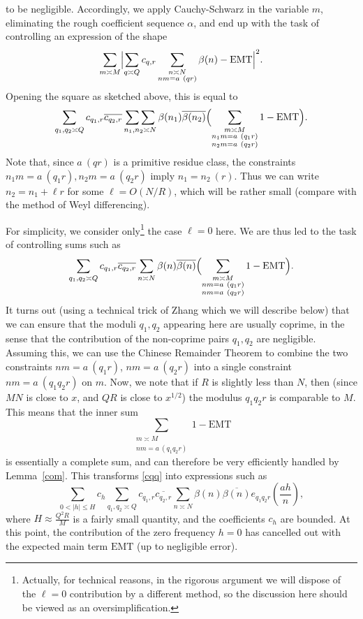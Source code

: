\documentclass[12pt,a4paper,reqno]{amsart}
\numberwithin{equation}{section}
\theoremstyle{plain}
\theoremstyle{definition}
\newcommand{\emt}{\mathrm{EMT}}
\newcommand\sumsum{\mathop{\sum\sum}\limits}
\renewcommand{\sim}{\asymp}
\begin{document}
to be negligible.  Accordingly, we apply Cauchy-Schwarz in the 
variable $m$, eliminating the rough coefficient sequence $\alpha$, and end
up with the task of controlling an expression of the shape
$$
\sum_{m \sim M} \Bigl|\sum_{q\sim Q} c_{q,r} \sum_{\substack{n \sim
    N\\ nm = a\ (qr)}} \beta(n)-\emt\Bigr|^2.
$$ 
Opening the square as sketched above, this is equal to
$$
\sum_{q_1,q_2 \sim Q} c_{q_1,r} \overline{c_{q_2,r}}
\sumsum_{n_1,n_2\sim N} \beta(n_1) \overline{\beta(n_2)} \Bigl(
\sum_{\substack{m \sim M\\ n_1m =a\ (q_1r)\\ n_2m= a\ (q_2 r)}}
1-\emt\Bigr).
$$ 
Note that, since $a\ (qr)$ is a primitive residue class, the
constraints $n_1 m = a\ (q_1r), n_2 m = a\ (q_2 r)$ imply $n_1 = n_2\
(r)$. Thus we can write $n_2 = n_1 + \ell r$ for some $\ell = O(N/R)$, which
will be rather small (compare with the method of Weyl differencing).
\par
For simplicity, we consider only\footnote{Actually, for technical reasons, in the rigorous argument we will dispose of the $\ell=0$ contribution by a different method, so the discussion here should be viewed as an oversimplification.} the case $\ell=0$ here.  We are thus led
to the task of controlling sums such as
\begin{equation}\label{cqq}
  \sum_{q_1,q_2 \sim Q} c_{q_1,r} \overline{c_{q_2,r}} \sum_{n \sim N} \beta(n) \overline{\beta(n)} \Bigl(\sum_{\substack{m \sim M\\ nm =a\ (q_1r)\\ nm= a\ (q_2 r)}} 1-\emt\Bigr).
 \end{equation}
 It turns out (using a technical trick of Zhang which we will describe
 below) that we can ensure that the moduli $q_1,q_2$ appearing here
 are usually coprime, in the sense that the contribution of the
 non-coprime pairs $q_1,q_2$ are negligible.  Assuming this, we can
 use the Chinese Remainder Theorem to combine the two constraints $nm
 = a\ (q_1r)$, $nm = a\ (q_2r)$ into a single constraint $nm =a\ (q_1
 q_2 r)$ on $m$.  Now, we note that if $R$ is slightly less than $N$, then
 (since $MN$ is close to $x$, and $QR$ is close to $x^{1/2}$) the
 modulus $q_1 q_2 r$ is comparable to $M$.  This means that the inner
 sum 
$$
\sum_{\substack{m \sim M\\ nm =a\ (q_1q_2r)}} 1-\emt
$$ 
is essentially a complete sum, and can therefore be very efficiently
handled by Lemma~\ref{com}. This transforms \eqref{cqq} into
expressions such as
$$ 
\sum_{0 < |h| \leq H} c_h \sum_{q_1,q_2 \sim Q} c_{q_1,r}
\overline{c_{q_2,r}} \sum_{n \sim N} \beta(n) \overline{\beta(n)}
e_{q_1 q_2 r}\left(\frac{ah}{n}\right),
$$ 
where $H \approx \frac{Q^2 R}{M}$ is a fairly small quantity, and the
coefficients $c_h$ are bounded. At this point, the contribution of the
zero frequency $h=0$ has cancelled out with the expected main term
$\emt$ (up to negligible error).
\end{document}
